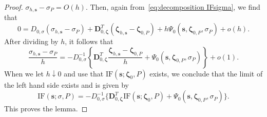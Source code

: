 \documentclass{article}
\numberwithin{equation}{section}
\theoremstyle{plain}
\newcommand{\bzeta}{\bm\zeta}
\newcommand{\bs}{\mathbf{s}}
\newcommand{\bD}{\mathbf{D}}
\begin{document}
\begin{proof}
$\sigma_{h,\bs}-\sigma_P=O(h)$.
Then, again from~\eqref{eq:decomposition IFsigma}, we find that
\[
0
=
D_{0,\sigma}
(\sigma_{h,\bs}-\sigma_P)
+
\bD_{0,\bzeta}^T
(\bzeta_{h,\bs}-\bzeta_{0,P})
+
h\Psi_0(\bs,\bzeta_{0,P},\sigma_P)
+
o(h).
\]
After dividing by $h$, it follows that
\[
\frac{\sigma_{h,\bs}-\sigma_P}{h}
=
-D_{0,\sigma}^{-1}
\left\{
\bD_{0,\bzeta}^T
\frac{\bzeta_{h,\bs}-\bzeta_{0,P}}{h}
+
\Psi_0(\bs,\bzeta_{0,P},\sigma_P)
\right\}
+
o(1).
\]
When we let $h\downarrow0$ and use that $\text{IF}(\bs;\bzeta_0,P)$ exists, 
we conclude that the limit of the left hand side exists and is given by
\[
\text{IF}(\bs;\sigma,P)
=
-D_{0,\sigma}^{-1}
\Big\{
\bD_{0,\bzeta}^T
\text{IF}(\bs;\bzeta_0,P)
+
\Psi_0(\bs,\bzeta_{0,P},\sigma_P)
\Big\}.
\]
This proves the lemma.
\end{proof}
\end{document}
